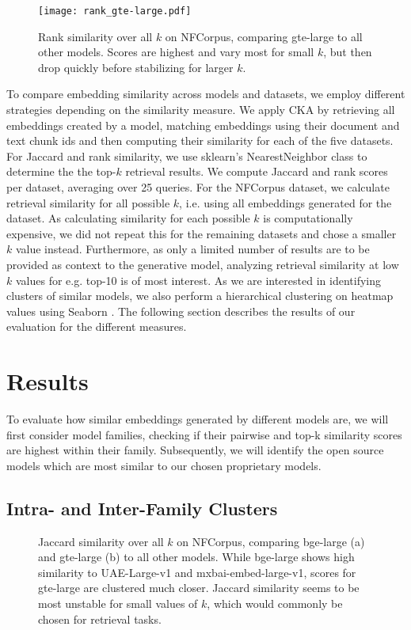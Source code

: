 \documentclass[nonacm,sigconf]{acmart}
\begin{document}
\begin{figure}[]
    \centering
    \texttt{[image: rank\_gte-large.pdf]}
    \caption{Rank similarity over all $k$ on NFCorpus, comparing gte-large to all other models. Scores are highest and vary most for small $k$, but then drop quickly before stabilizing for larger $k$.}
    \label{fig:rank_nf}
\end{figure}

To compare embedding similarity across models and datasets, we employ different strategies depending on the similarity measure. We apply CKA by retrieving all embeddings created by a model, matching embeddings using their document and text chunk ids and then computing their similarity for each of the five datasets. For Jaccard and rank similarity, we use sklearn's NearestNeighbor class \cite{scikit} to determine the the top-$k$ retrieval results. We compute Jaccard and rank scores per dataset, averaging over 25 queries. For the NFCorpus dataset, we calculate retrieval similarity for all possible $k$, i.e. using all embeddings generated for the dataset. As calculating similarity for each possible $k$ is computationally expensive, we did not repeat this for the remaining datasets and chose a smaller $k$ value instead. Furthermore, as only a limited number of results are to be provided as context to the generative model, analyzing retrieval similarity at low $k$ values for e.g. top-10 is of most interest. As we are interested in identifying clusters of similar models, we also perform a hierarchical clustering on heatmap values using Seaborn \cite{seaborn}. The following section describes the results of our evaluation for the different measures.

\section{Results}

To evaluate how similar embeddings generated by different models are, we will first consider model families, checking if their pairwise and top-k similarity scores are highest within their family. Subsequently, we will identify the open source models which are most similar to our chosen proprietary models.

\subsection{Intra- and Inter-Family Clusters}

\begin{figure*}
    \centering
    \caption{Jaccard similarity over all $k$ on NFCorpus, comparing bge-large (a) and gte-large (b) to all other models. While bge-large shows high similarity to UAE-Large-v1 and mxbai-embed-large-v1, scores for gte-large are clustered much closer. Jaccard similarity seems to be most unstable for small values of $k$, which would commonly be chosen for retrieval tasks.}
    \label{fig:jac_nf}
\end{figure*}
\end{document}
